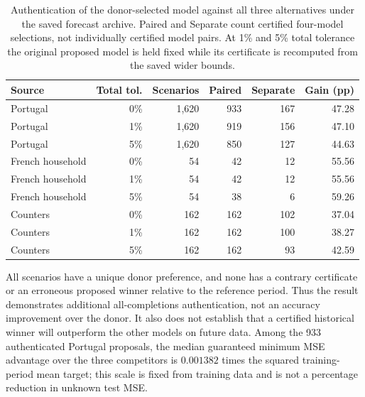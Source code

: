 \begin{table}[htbp]
\centering\small
\caption{Authentication of the donor-selected model against all three
alternatives under the saved forecast archive. Paired and Separate count
certified four-model selections, not individually certified model pairs.
At 1\% and 5\% total tolerance the original proposed model is held fixed
while its certificate is recomputed from the saved wider bounds.}
\label{tab:practical-model-selection}
\begin{tabular}{lrrrrr}
\toprule
Source & Total tol. & Scenarios & Paired & Separate & Gain (pp)\\
\midrule
Portugal & 0\% & 1,620 & 933 & 167 & 47.28 \\
Portugal & 1\% & 1,620 & 919 & 156 & 47.10 \\
Portugal & 5\% & 1,620 & 850 & 127 & 44.63 \\
French household & 0\% & 54 & 42 & 12 & 55.56 \\
French household & 1\% & 54 & 42 & 12 & 55.56 \\
French household & 5\% & 54 & 38 & 6 & 59.26 \\
Counters & 0\% & 162 & 162 & 102 & 37.04 \\
Counters & 1\% & 162 & 162 & 100 & 38.27 \\
Counters & 5\% & 162 & 162 & 93 & 42.59 \\
\bottomrule
\end{tabular}
\end{table}
\FloatBarrier

All scenarios have a unique donor preference, and none has a contrary
certificate or an erroneous proposed winner relative to the reference
period. Thus the result demonstrates additional all-completions
authentication, not an accuracy improvement over the donor. It also does
not establish that a certified historical winner will outperform the
other models on future data. Among the 933 authenticated Portugal
proposals, the median guaranteed minimum MSE advantage over the three
competitors is $0.001382$ times the squared training-period mean target;
this scale is fixed from training data and is not a percentage reduction
in unknown test MSE.

